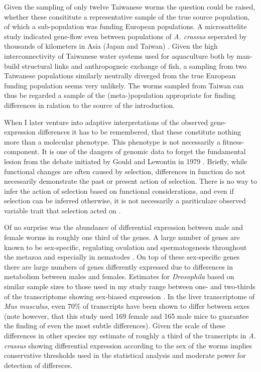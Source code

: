 Given the sampling of only twelve Taiwanese worms the question could
be raised, whether these consititute a representative sample of the
true source population, of which a sub-population was funding European
populations. A microsattelite study indicated gene-flow even between
populations of \textit{A. crassus} seperated by thousands of
kilometers in Asia (Japan and Taiwan)
\cite{wielgoss_population_2008}. Given the high interconnectivity of
Taiwanese water systems used for aquaculture both by man-build
structural links and anthropogneic exchange of fish, a sampling from
two Taiwanese populations similarly neutrally diverged from the true
European funding population seems very unlikely. The worms sampled
from Taiwan can thus be regarded a sample of the (meta-)population
appropriate for finding differences in ralation to the source of the
introduction.

When I later venture into adaptive interpretations of the observed
gene-expression differences it has to be remembered, that these
constitute nothing more than a molecular phenotype. This phenotype is
not necessarily a fitness-component. It is one of the dangers of
genomic data to forget the fundamental lesion from the debate
initiated by Gould and Lewontin in 1979
\cite{gould_spandrels_1979}. Briefly, while functional changes are
often caused by selection, differences in function do not necessarily
demonstrate the past or present action of selection. There is no way
to infer the action of selection based on functional considerations,
and even if selection can be inferred otherwise, it is not necessarily
a pariticulare observed variable trait that selection acted on
\cite{pmid19744124}.

Of no surprise was the abundance of differential expression between
male and female worms in roughly one third of the genes. A large
number of genes are known to be sex-specific, regulating ovulation and
spermatogenesis throughout the metazoa and especially in nematodes
\cite{pmid15371532}. On top of these sex-specific genes there are
large numbers of genes differently expressed due to differences in
metabolism between males and females. Estimates for
\textit{Drosophila} based on similar sample sizes to those used in my
study range between one- and two-thirds of the transcriptome showing
sex-biased expression \cite{pmid11726925}. In the liver transcriptome
of \textit{Mus musculus}, even 70\% of transcripts have been shown to
differ between sexes \cite{pmid16825664} (note however, that this
study used 169 female and 165 male mice to guarantee the finding of
even the most subtle differences). Given the scale of these
differences in other species my estimate of roughly a third of the
transcripts in \textit{A. crassus} showing differential expression
according to the sex of the worms implies conservative thresholds used
in the statistical analysis and moderate power for detection of
differeces.

